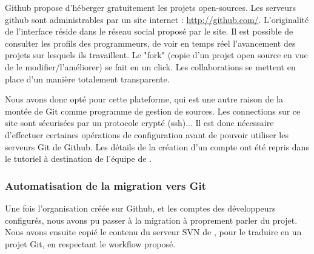 Github propose d'héberger gratuitement les projets open-sources. Les serveurs github sont administrables par un site
internet : \url{http://github.com/}. L'originalité de l'interface réside dans le réseau social proposé par le site. Il est possible de consulter les profils des programmeurs, de voir en temps réel l'avancement des projets sur lesquels ils travaillent. Le "fork" (copie d'un projet open source en vue de le modifier/l'améliorer) se fait en un click. Les collaborations se mettent en place d'un manière totalement transparente.

Nous avons donc opté pour cette plateforme, qui est une autre raison de la montée de Git comme programme de gestion de sources. Les connections sur ce site sont sécurisées par un protocole crypté (ssh)... Il est donc nécessaire d'effectuer certaines opérations de configuration avant de pouvoir utiliser les serveurs Git de Github. Les détails de la création d'un compte ont été repris dans le tutoriel à destination de l'équipe de {\gofigure}.

\subsubsection{Automatisation de la migration vers Git}

Une fois l'organisation \gofigure créée sur Github, et les comptes des développeurs configurés, nous avons pu passer à la migration à proprement parler du projet.
Nous avons ensuite copié le contenu du serveur SVN de {\gofigure},
pour le traduire en un projet Git, en respectant le workflow proposé.

